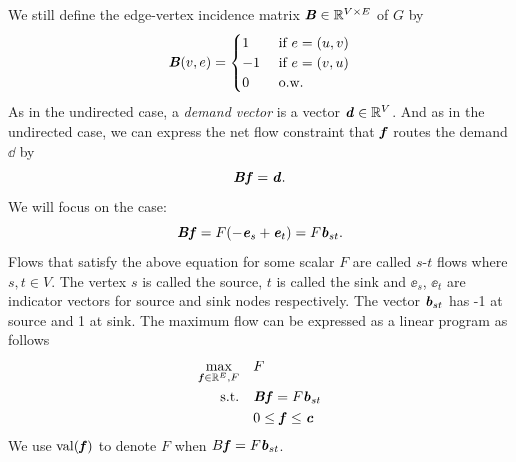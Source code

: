 We still define the edge-vertex incidence matrix $\boldsymbol{\mathit{B}} \in \mathbb{R}^{V \times E}$ of $G$ by
\[
  \boldsymbol{\mathit{B}}(v,e) =
  \begin{cases}
    1 & \text{ if } e = (u,v) \\
    -1 &\text{ if } e = (v,u) \\
    0 &\text{ o.w.}
  \end{cases}
\]
As in the undirected case, a \emph{demand vector} is a vector \(\boldsymbol{\mathit{d}} \in \mathbb{R}^{V} \).
And as in the undirected case, we can express the net flow constraint that
$\boldsymbol{\mathit{f}}$ routes the demand $\dd$ by
\[
  \boldsymbol{\mathit{B}} \boldsymbol{\mathit{f}} = \boldsymbol{\mathit{d}}
  .
\]
We will focus on the case:
  \begin{equation} \nonumber
      \boldsymbol{\mathit{B}}\boldsymbol{\mathit{f}}= F (-\boldsymbol{\mathit{e}}_{s}+\boldsymbol{\mathit{e}}_t) = F \boldsymbol{\mathit{b}}_{st}.
  \end{equation}
 Flows that satisfy the above equation for some scalar \(F\) are
 called $s$-$t$ flows where \(s, t \in V\).
 The vertex \(s\) is called the source, \(t\) is called the sink and  \(\ee_s\), \(\ee_t\) are indicator vectors for source and sink nodes respectively. The vector \(\boldsymbol{\mathit{b}}_{st}\) has -1 at source and 1 at sink. The maximum flow can be expressed as a linear program as follows
 \begin{equation}
   \label{eq:maxflow}
\begin{aligned}
\max_{\boldsymbol{\mathit{f}} \in \mathbb{R}^E,F} \quad & F\\
\textrm{s.t.} \quad & \boldsymbol{\mathit{B}}\boldsymbol{\mathit{f}}= F \boldsymbol{\mathit{b}}_{st}\\
  & 0 \leq \boldsymbol{\mathit{f}} \leq \boldsymbol{\mathit{c}}   \\
\end{aligned}
\end{equation}
We use $\operatorname*{val}(\boldsymbol{\mathit{f}})$ to denote $F$ when $B\boldsymbol{\mathit{f}} = F\boldsymbol{\mathit{b}}_{st}$.


